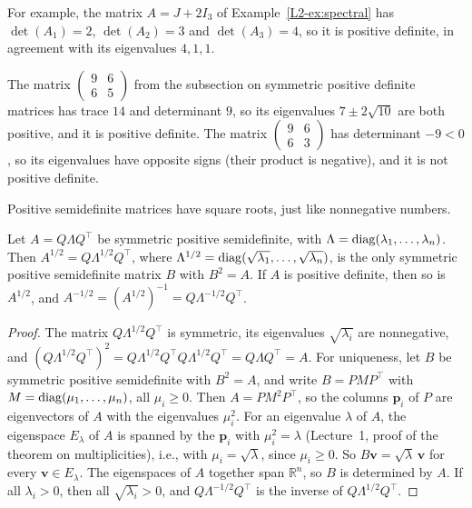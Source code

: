 For example, the matrix $A = J + 2I_3$ of Example~\ref{L2-ex:spectral} has $\det(A_1) = 2$, $\det(A_2) = 3$ and $\det(A_3) = 4$, so it is positive definite, in agreement with its eigenvalues $4, 1, 1$.

\begin{example}
    The matrix $\begin{pmatrix} 9 & 6 \\ 6 & 5 \end{pmatrix}$ from the subsection on symmetric positive definite matrices has trace $14$ and determinant $9$, so its eigenvalues $7 \pm 2\sqrt{10}$ are both positive, and it is positive definite. The matrix $\begin{pmatrix} 9 & 6 \\ 6 & 3 \end{pmatrix}$ has determinant $-9 < 0$, so its eigenvalues have opposite signs (their product is negative), and it is not positive definite.
\end{example}

Positive semidefinite matrices have square roots, just like nonnegative numbers.

\begin{proposition}\label{L2-prop:sqrt}
    Let $A = Q\Lambda Q^\top$ be symmetric positive semidefinite, with $\Lambda = \operatorname{diag}(\lambda_1, \ldots, \lambda_n)$. Then $A^{1/2} = Q\Lambda^{1/2}Q^\top$, where $\Lambda^{1/2} = \operatorname{diag}(\sqrt{\lambda_1}, \ldots, \sqrt{\lambda_n})$, is the only symmetric positive semidefinite matrix $B$ with $B^2 = A$. If $A$ is positive definite, then so is $A^{1/2}$, and $A^{-1/2} = (A^{1/2})^{-1} = Q\Lambda^{-1/2}Q^\top$.
\end{proposition}

\begin{proof}
    The matrix $Q\Lambda^{1/2}Q^\top$ is symmetric, its eigenvalues $\sqrt{\lambda_i}$ are nonnegative, and $(Q\Lambda^{1/2}Q^\top)^2 = Q\Lambda^{1/2}Q^\top Q\Lambda^{1/2}Q^\top = Q\Lambda Q^\top = A$. For uniqueness, let $B$ be symmetric positive semidefinite with $B^2 = A$, and write $B = PMP^\top$ with $M = \operatorname{diag}(\mu_1, \ldots, \mu_n)$, all $\mu_i \geq 0$. Then $A = PM^2P^\top$, so the columns $\mathbf{p}_i$ of $P$ are eigenvectors of $A$ with the eigenvalues $\mu_i^2$. For an eigenvalue $\lambda$ of $A$, the eigenspace $E_\lambda$ of $A$ is spanned by the $\mathbf{p}_i$ with $\mu_i^2 = \lambda$ (Lecture~1, proof of the theorem on multiplicities), i.e., with $\mu_i = \sqrt{\lambda}$, since $\mu_i \geq 0$. So $B\mathbf{v} = \sqrt{\lambda}\,\mathbf{v}$ for every $\mathbf{v} \in E_\lambda$. The eigenspaces of $A$ together span $\mathbb{R}^n$, so $B$ is determined by $A$. If all $\lambda_i > 0$, then all $\sqrt{\lambda_i} > 0$, and $Q\Lambda^{-1/2}Q^\top$ is the inverse of $Q\Lambda^{1/2}Q^\top$.
\end{proof}

